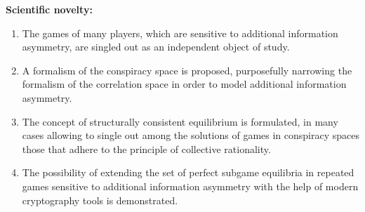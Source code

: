 \textbf{Scientific novelty:}
\begin{enumerate}[beginpenalty=10000] %
  \item The games of many players, which are sensitive to additional information asymmetry, are singled out as an independent object of study. %
  \item A formalism of the conspiracy space is proposed, purposefully narrowing the formalism of the correlation space in order to model additional information asymmetry. %
  \item The concept of structurally consistent equilibrium is formulated, in many cases allowing to single out among the solutions of games in conspiracy spaces those that adhere to the principle of collective rationality. %
  \item The possibility of extending the set of perfect subgame equilibria in repeated games sensitive to additional information asymmetry  with the help of modern cryptography tools is demonstrated. %
\end{enumerate}

